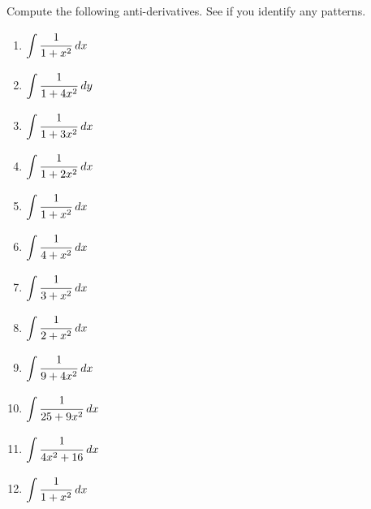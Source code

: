 \documentclass[12pt, letterpaper]{report}
\newcommand{\0}{\emptyset}
\theoremstyle{theorem}
\theoremstyle{definition}
\theoremstyle{definition}
\theoremstyle{definition}
\theoremstyle{definition}
\theoremstyle{theorem}
\theoremstyle{theorem}
\theoremstyle{remark}
\begin{document}
Compute the following anti-derivatives.  See if you identify any patterns.
\begin{multicols}{3}
\bfseries{\begin{Large}
	\begin{enumerate}
		\item $\displaystyle\int \cfrac{1}{1+x^2}\; dx$
		\vspace{3cm}
		\item $\displaystyle\int \cfrac{1}{1+4x^2}\; dy$
		\vspace{3cm}
		\item $\displaystyle\int \cfrac{1}{1+3x^2}\; dx$
		\vspace{3cm}
		\item $\displaystyle\int \cfrac{1}{1+2x^2}\; dx$
		\vspace{3cm}
		\item $\displaystyle\int \cfrac{1}{1+x^2}\; dx$
		\vspace{3cm}
		\item $\displaystyle\int \cfrac{1}{4+x^2}\; dx$
		\vspace{3cm}
		\item $\displaystyle\int \cfrac{1}{3+x^2}\; dx$
		\vspace{3cm}
		\item $\displaystyle\int \cfrac{1}{2+x^2}\; dx$
		\vspace{3cm}
		\item $\displaystyle\int \cfrac{1}{9+4x^2}\; dx$
		\vspace{3cm}
		\item $\displaystyle\int \cfrac{1}{25+9x^2}\; dx$
		\vspace{3cm}
		\item $\displaystyle\int \cfrac{1}{4x^2+16}\; dx$
		\vspace{3cm}
		\item $\displaystyle\int \cfrac{1}{1+x^2}\; dx$
	\end{enumerate}
\end{Large}}

\end{multicols}


	
\end{document}
